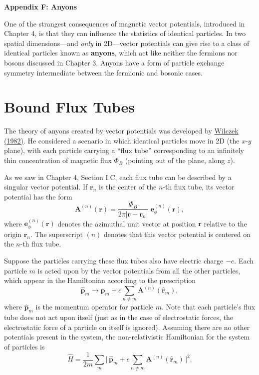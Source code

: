\documentclass[pra,12pt]{revtex4}
\begin{document}
\begin{center}
{\large \textbf{Appendix F: Anyons}}
\end{center}

One of the strangest consequences of magnetic vector potentials,
introduced in Chapter 4, is that they can influence the statistics of
identical particles.  In two spatial dimensions---and \textit{only} in
2D---vector potentials can give rise to a class of identical particles
known as \textbf{anyons}, which act like neither the fermions nor
bosons discussed in Chapter 3.  Anyons have a form of particle
exchange symmetry intermediate between the fermionic and
bosonic cases.

\section{Bound Flux Tubes}

The theory of anyons created by vector potentials was developed by
\hyperref[cite:wilczek]{Wilczek (1982)}.  He considered a scenario in
which identical particles move in 2D (the $x$-$y$ plane), with each
particle carrying a ``flux tube'' corresponding to an infinitely thin
concentration of magnetic flux $\Phi_B$ (pointing out of the plane,
along $z$).

As we saw in Chapter 4, Section I.C, each flux tube can be described
by a singular vector potential.  If $\mathbf{r}_n$ is the center of
the $n$-th flux tube, its vector potential has the form
\begin{equation}
  \mathbf{A}^{(n)}(\mathbf{r}) = \frac{\Phi_B}{2\pi
    |\mathbf{r}-\mathbf{r}_n|} \; \mathbf{e}_\phi^{(n)}(\mathbf{r}),
  \label{Asolenoid}
\end{equation}
where $\mathbf{e}_\phi^{(n)}(\mathbf{r})$ denotes the azimuthal unit
vector at position $\mathbf{r}$ relative to the origin $\mathbf{r}_n$.
The superscript $(n)$ denotes that this vector potential is centered
on the $n$-th flux tube.

Suppose the particles carrying these flux tubes also have electric
charge $-e$.  Each particle $m$ is acted upon by the vector potentials
from all the other particles, which appear in the Hamiltonian
according to the prescription
\begin{equation}
  \hat{\mathbf{p}}_m \rightarrow \hat{\mathbf{p}}_m
  + e \sum_{n \ne m} \mathbf{A}^{(n)}(\hat{\mathbf{r}}_m),
\end{equation}
where $\hat{\mathbf{p}}_m$ is the momentum operator for particle $m$.
Note that each particle's flux tube does not act upon itself (just as
in the case of electrostatic forces, the electrostatic force of a
particle on itself is ignored).  Assuming there are no other
potentials present in the system, the non-relativistic Hamiltonian for
the system of particles is
\begin{equation}
  \hat{H} = \frac{1}{2m} \sum_m \Big| \,\hat{\mathbf{p}}_m
  + e \sum_{n \ne m} \mathbf{A}^{(n)}(\hat{\mathbf{r}}_m)\,\Big|^2.
\end{equation}
\end{document}
